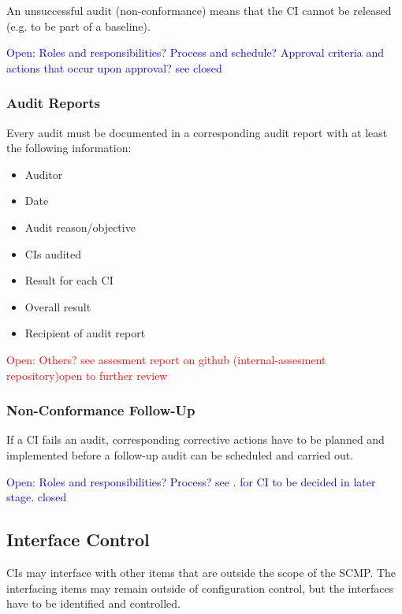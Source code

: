 \documentclass{template/openetcs_report}
\begin{document}
An unsuccessful audit (non-conformance) means that the CI cannot be released (e.g. to be part of a baseline).

\textcolor{blue}{Open: Roles and responsibilities? Process and schedule? Approval criteria and actions that occur upon approval? see \cite{ADD} closed}


\subsubsection{Audit Reports} %
\label{sec:Audit Reports}

Every audit must be documented in a corresponding audit report with at least the following information:

\vspace{-10pt}
\begin{itemize}
\item Auditor
\item Date
\item Audit reason/objective
\item CIs audited
\item Result for each CI
\item Overall result
\item Recipient of audit report
\end{itemize}

\textcolor{red}{Open: Others? see assesment report on github (internal-assesment repository)open to further review}


\subsubsection{Non-Conformance Follow-Up} %
\label{sec:Non-Conformance Follow-Up}

If a CI fails an audit, corresponding corrective actions have to be planned and implemented before a follow-up audit can be scheduled and carried out. 

\textcolor{blue}{Open: Roles and responsibilities? Process? see \cite{ADD}. for CI to be decided in later stage. closed}


\subsection{Interface Control} %
\label{sec:Interface Control}

CIs may interface with other items that are outside the scope of the SCMP. The interfacing items may remain outside of configuration control, but the interfaces have to be identified and controlled.
\end{document}
